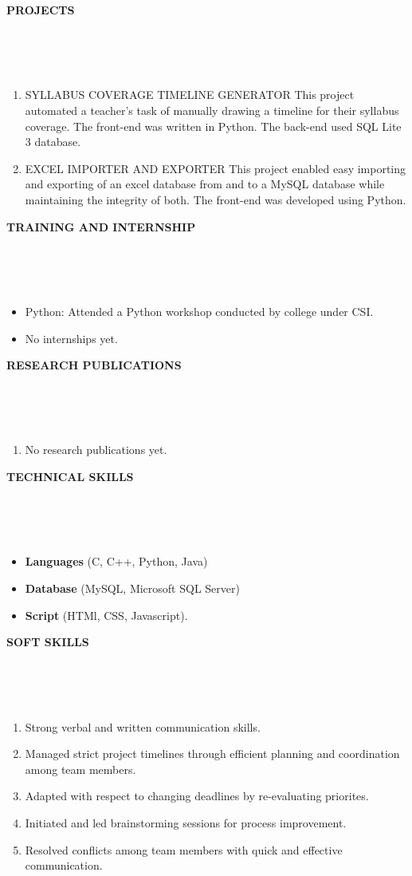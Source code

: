 \documentclass[a4paper,10pt]{article}
\newcommand{\lsep}{-0.5cm}
\newcommand{\resheading}[1]{{\small \colorbox{mygrey}{\begin{minipage}{0.975\textwidth}{\textbf{#1 \vphantom{p\^{E}}}}\end{minipage}}}}
\begin{document}
\resheading{\textbf{PROJECTS} }\\[\lsep]
\\ \\
\begin{enumerate}
	\item SYLLABUS COVERAGE TIMELINE GENERATOR
	\subitem This project automated a teacher's task of manually drawing a timeline for their syllabus coverage. The front-end was written in Python. The back-end used SQL Lite 3 database.
	\item EXCEL IMPORTER AND EXPORTER
	\subitem This project enabled easy importing and exporting of an excel database from and to a MySQL database while maintaining the integrity of both. The front-end was developed using Python.
\end{enumerate}


\resheading{\textbf{TRAINING AND INTERNSHIP} }\\[\lsep]
\\ \\
\begin{itemize}
	\item Python:
	Attended a Python workshop conducted by college under CSI.
	\item No internships yet.
\end{itemize}

\resheading{\textbf{RESEARCH PUBLICATIONS} }\\[\lsep]
\\ \\
\begin{enumerate}
	\item No research publications yet.
\end{enumerate}


\resheading{\textbf{TECHNICAL SKILLS} }\\[\lsep]
\\ \\
\begin{itemize}
	\item \noindent \textbf{Languages} (C, C++, Python, Java)
	\item \noindent \textbf{Database} (MySQL, Microsoft SQL Server)
	\item \noindent \textbf{Script} (HTMl, CSS, Javascript).
\end{itemize}


\resheading{\textbf{SOFT SKILLS} }\\[\lsep]
\\ \\
\begin{enumerate}
	\item \noindent Strong verbal and written communication skills.
	\item \noindent Managed strict project timelines through efficient planning and coordination among team members.
	\item \noindent Adapted with respect to changing deadlines by re-evaluating priorites.
	\item \noindent Initiated and led brainstorming sessions for process improvement.
	\item \noindent Resolved conflicts among team members with quick and effective communication.
\end{enumerate}
\end{document}
